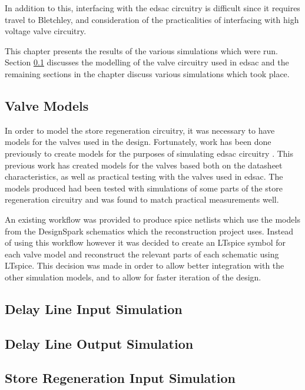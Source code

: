 In addition to this, interfacing with the \gls{edsac} circuitry is difficult since it requires travel to Bletchley, and consideration of the practicalities of interfacing with high voltage valve circuitry.

This chapter presents the results of the various simulations which were run. Section \ref{sec:spice-valve-models} discusses the modelling of the valve circuitry used in \gls{edsac} and the remaining sections in the chapter discuss various simulations which took place.

\subsection{Valve Models} \label{sec:spice-valve-models}

In order to model the store regeneration circuitry, it was necessary to have models for the valves used in the design. Fortunately, work has been done previously to create models for the purposes of simulating \gls{edsac} circuitry \cite{linnington2015}. This previous work has created models for the valves based both on the datasheet characteristics, as well as practical testing with the valves used in \gls{edsac}. The models produced had been tested with simulations of some parts of the store regeneration circuitry and was found to match practical measurements well.

An existing workflow was provided to produce \gls{spice} netlists which use the models from the DesignSpark \cite{rs2017} schematics which the reconstruction project uses. Instead of using this workflow however it was decided to create an LTspice symbol for each valve model and reconstruct the relevant parts of each schematic using LTspice. This decision was made in order to allow better integration with the other simulation models, and to allow for faster iteration of the design.

\subsection{Delay Line Input Simulation}

\subsection{Delay Line Output Simulation}

\subsection{Store Regeneration Input Simulation}

